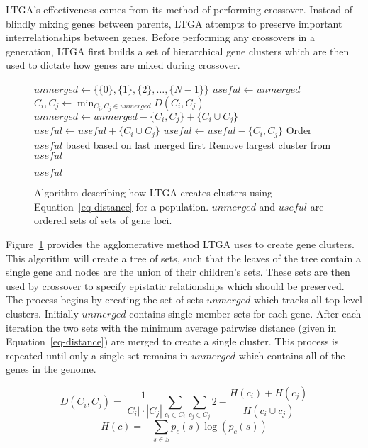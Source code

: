 \documentclass[twoside]{article}
\begin{document}
LTGA's effectiveness comes from its method of performing crossover. Instead of blindly
mixing genes between parents, LTGA attempts to preserve important interrelationships
between genes. Before performing any crossovers in a generation, LTGA first builds
a set of hierarchical gene clusters which are then used to dictate how genes are mixed
during crossover.

\begin{figure}
  \begin{algorithmic}[1]
    \State $unmerged \leftarrow \{\{0\}, \{1\}, \{2\}, \dots, \{N-1\}\}$
    \State $useful \leftarrow unmerged$
      \State $C_i, C_j \leftarrow \min_{C_i,C_j \in unmerged} D(C_i, C_j)$
      \State $unmerged \leftarrow unmerged - \{C_i, C_j\} + \{C_i \cup C_j\}$
      \State $useful \leftarrow useful + \{C_i \cup C_j\}$
        \State $useful \leftarrow useful - \{C_i, C_j\}$
      \EndIf
    \EndWhile
    \State Order $useful$ based based on last merged first\label{fig-cluster-creation-ordering}
    \State Remove largest cluster from $useful$

    \Return $useful$
  \EndProcedure
\end{algorithmic}
  \caption{Algorithm describing how LTGA creates clusters using Equation~\ref{eq-distance}
           for a population. $unmerged$ and $useful$ are ordered sets of sets of gene loci.}
  \label{fig-cluster-creation}
\end{figure}

Figure~\ref{fig-cluster-creation} provides the agglomerative method LTGA uses to create gene clusters.
This algorithm will create a tree of sets, such that the leaves of the tree contain a single gene and
nodes are the union of their children's sets. These sets are then used by crossover to specify epistatic
relationships which should be preserved.
The process begins by creating the set of sets $unmerged$ which tracks all top level clusters. Initially
$unmerged$ contains single member sets for each gene. After each iteration the two sets with the minimum average pairwise
distance (given in Equation~\ref{eq-distance}) are merged to create a single cluster. This process is repeated
until only a single set remains in $unmerged$ which contains all of the genes in the genome.

\begin{equation}
  D(C_i,C_j) = \frac{1}{\left | C_i \right |\cdot \left |C_j \right|}\sum_{c_i \in C_i}\sum_{c_j \in C_j}
  2 - \frac{H(c_i) + H(c_j)}{H(c_i \cup c_j)}
  \label{eq-distance}
\end{equation}
\begin{equation}
  H(c) = -\sum_{s\in S} p_c(s)\log(p_c(s))
  \label{eq-entropy}
\end{equation}
\end{document}
